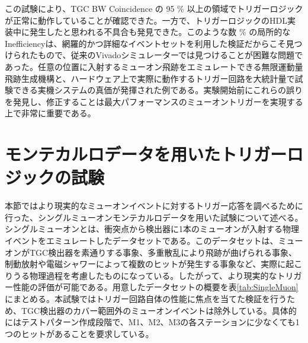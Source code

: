 この試験により、TGC BW Coincidence の 95 \% 以上の領域でトリガーロジックが正常に動作していることが確認できた。一方で、トリガーロジックのHDL実装中に発生したと思われる不具合も発見できた。このような数 \% の局所的なInefficiencyは、網羅的かつ詳細なイベントセットを利用した検証だからこそ見つけられたもので、従来のVivadoシミュレーターでは見つけることが困難な問題であった。任意の位置に入射するミューオン飛跡をエミュレートできる無限運動量飛跡生成機構と、ハードウェア上で実際に動作するトリガー回路を大統計量で試験できる実機システムの真価が発揮された例である。実験開始前にこれらの誤りを発見し、修正することは最大パフォーマンスのミューオントリガーを実現する上で非常に重要である。


\section{モンテカルロデータを用いたトリガーロジックの試験}
\label{sec_SingleMuon}

本節ではより現実的なミューオンイベントに対するトリガー応答を調べるために行った、シングルミューオンモンテカルロデータを用いた試験について述べる。シングルミューオンとは、衝突点から検出器に1本のミューオンが入射する物理イベントをエミュレートしたデータセットである。このデータセットは、ミューオンがTGC検出器を素通りする事象、多重散乱により飛跡が曲げられる事象、制動放射や電磁シャワーによって複数のヒットが発生する事象など、実際に起こりうる物理過程を考慮したものになっている。したがって、より現実的なトリガー性能の評価が可能である。用意したデータセットの概要を表\ref{tab:SingleMuon}にまとめる。本試験ではトリガー回路自体の性能に焦点を当てた検証を行うため、TGC検出器のカバー範囲外のミューオンイベントは除外している。具体的にはテストパターン作成段階で、M1、M2、M3の各ステーションに少なくても1つのヒットがあることを要求している。


